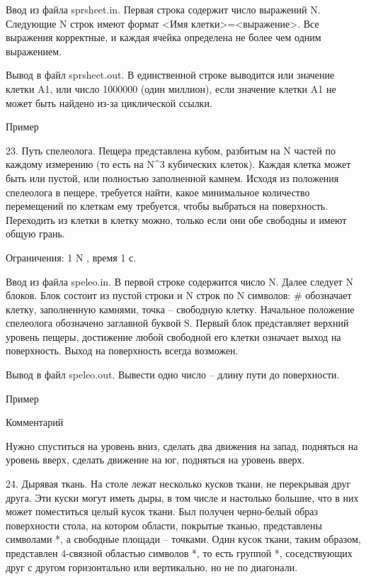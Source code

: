 \documentclass[]{article}
\begin{document}
Ввод из файла sprsheet.in. Первая строка содержит число выражений N. Следующие N строк имеют формат <Имя клетки>=<выражение>. Все выражения корректные, и каждая ячейка определена не более чем одним выражением.

Вывод в файл sprsheet.out. В единственной строке выводится или значение клетки A1, или число 1000000 (один миллион), если значение клетки A1 не может быть найдено из-за циклической ссылки.

Пример



23. Путь спелеолога. Пещера представлена кубом, разбитым на N частей по каждому измерению (то есть на N^3 кубических клеток). Каждая клетка может быть или пустой, или полностью заполненной камнем. Исходя из положения спелеолога в пещере, требуется найти, какое минимальное количество перемещений по клеткам ему требуется, чтобы выбраться на поверхность. Переходить из клетки в клетку можно, только если они обе свободны и имеют общую грань.

Ограничения: 1 \leq N , время 1 с.

Ввод из файла speleo.in. В первой строке содержится число N. Далее следует N блоков. Блок состоит из пустой строки и N строк по N символов: # обозначает клетку, заполненную камнями, точка – свободную клетку. Начальное положение спелеолога обозначено заглавной буквой S. Первый блок представляет верхний уровень пещеры, достижение любой свободной его клетки означает выход на поверхность. Выход на поверхность всегда возможен.

Вывод в файл speleo.out. Вывести одно число – длину пути до поверхности.

Пример



Комментарий

Нужно спуститься на уровень вниз, сделать два движения на запад, подняться на уровень вверх, сделать движение на юг, подняться на уровень вверх.

24. Дырявая ткань. На столе лежат несколько кусков ткани, не перекрывая друг друга. Эти куски могут иметь дыры, в том числе и настолько большие, что в них может поместиться целый кусок ткани. Был получен черно-белый образ поверхности стола, на котором области, покрытые тканью, представлены символами *, а свободные площади – точками. Один кусок ткани, таким образом, представлен 4-связной областью символов *, то есть группой *, соседствующих друг с другом горизонтально или вертикально, но не по диагонали.
\end{document}
